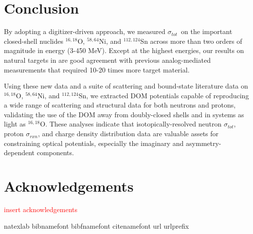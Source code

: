 \documentclass[twocolumn,secnumarabic,amssymb, nobibnotes, aps, prl,
superscriptaddress, nobalancelastpage]{revtex4}
\newcommand{\tot}{\ensuremath{\sigma_{tot}}}
\newcommand{\rxn}{\ensuremath{\sigma_{rxn}}}
\newcommand{\oSixEight}{\ensuremath{^{16,18}}O}
\newcommand{\niEightFour}{\ensuremath{^{58,64}}N\lowercase{i}}
\newcommand{\snTwelveFour}{\ensuremath{^{112,124}}S\lowercase{n}}
\begin{document}
\section{Conclusion}
By adopting a digitizer-driven
approach, we measured \tot\ on the important closed-shell nuclides
$^{16,18}$O, $^{58,64}$Ni, and $^{112,124}$Sn across more than two orders of
magnitude in energy (3-450 MeV). Except at the highest energies, our results
on natural targets in are good agreement with previous analog-mediated measurements
that required 10-20 times more target material. 

Using these new data and a suite of scattering and bound-state literature data
on \oSixEight, \niEightFour, and \snTwelveFour,
we extracted DOM potentials capable of reproducing a wide range of scattering
and structural data for both neutrons and protons, validating the use of the
DOM away from doubly-closed shells and in systems as light as \oSixEight.
These analyses indicate that isotopically-resolved neutron \tot,
proton \rxn, and charge density distribution data are valuable assets for
constraining optical potentials, especially the imaginary and
asymmetry-dependent components.


\section{Acknowledgements}
\textcolor{red}{insert acknowledgements}


\begin{thebibliography}{32} \expandafter\ifx\csname
        natexlab\endcsname\relax\def\natexlab#1{#1}\fi \expandafter\ifx\csname
        bibnamefont\endcsname\relax \def\bibnamefont#1{#1}\fi
        \expandafter\ifx\csname bibfnamefont\endcsname\relax
        \def\bibfnamefont#1{#1}\fi \expandafter\ifx\csname
        citenamefont\endcsname\relax \def\citenamefont#1{#1}\fi
        \expandafter\ifx\csname url\endcsname\relax \def\url#1{\texttt{#1}}\fi
        \expandafter\ifx\csname urlprefix\endcsname\relax\def\urlprefix{URL
        }\fi \providecommand{\bibinfo}[2]{#2}
        \providecommand{\eprint}[2][]{\url{#2}}

\end{thebibliography}
\end{document}
